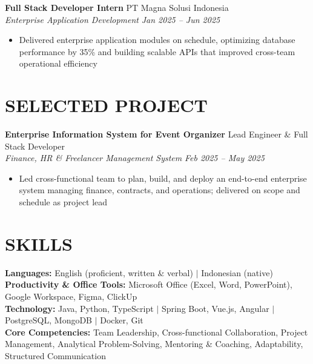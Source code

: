 \documentclass[10pt,a4paper]{article}
\newcommand{\experienceheader}[4]{
    \textbf{#1} \hfill #2 \\
    \textit{#3} \hfill \textit{#4}
}
\begin{document}
\vspace{1pt}
\experienceheader{Full Stack Developer Intern}{PT Magna Solusi Indonesia}{Enterprise Application Development}{Jan 2025 -- Jun 2025}
\begin{itemize}[leftmargin=*, itemsep=0pt, topsep=1pt]
    \item Delivered enterprise application modules on schedule, optimizing database performance by 35\% and building scalable APIs that improved cross-team operational efficiency
\end{itemize}

\vspace{-5pt}

\section*{SELECTED PROJECT}

\experienceheader{Enterprise Information System for Event Organizer}{Lead Engineer \& Full Stack Developer}{Finance, HR \& Freelancer Management System}{Feb 2025 -- May 2025}
\begin{itemize}[leftmargin=*, itemsep=0pt, topsep=1pt]
    \item Led cross-functional team to plan, build, and deploy an end-to-end enterprise system managing finance, contracts, and operations; delivered on scope and schedule as project lead
\end{itemize}

\vspace{-5pt}

\section*{SKILLS}

\textbf{Languages:} English (proficient, written \& verbal) $|$ Indonesian (native) \\
\textbf{Productivity \& Office Tools:} Microsoft Office (Excel, Word, PowerPoint), Google Workspace, Figma, ClickUp \\
\textbf{Technology:} Java, Python, TypeScript $|$ Spring Boot, Vue.js, Angular $|$ PostgreSQL, MongoDB $|$ Docker, Git \\
\textbf{Core Competencies:} Team Leadership, Cross-functional Collaboration, Project Management, Analytical Problem-Solving, Mentoring \& Coaching, Adaptability, Structured Communication
\end{document}
